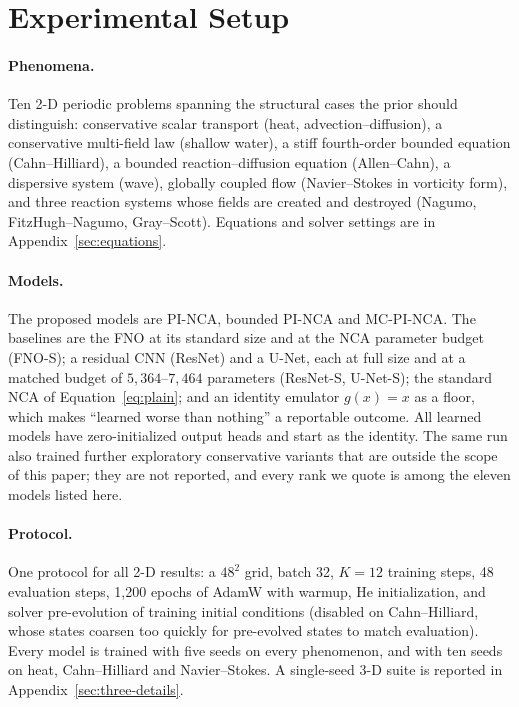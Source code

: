 \documentclass{article}
\begin{document}
\section{Experimental Setup}
\label{sec:problem}
\label{sec:protocol}
\paragraph{Phenomena.} Ten 2-D periodic problems spanning the structural cases the prior
should distinguish: conservative scalar transport (heat, advection--diffusion), a
conservative multi-field law (shallow water), a stiff fourth-order bounded equation
(Cahn--Hilliard), a bounded reaction--diffusion equation (Allen--Cahn), a dispersive
system (wave), globally coupled flow (Navier--Stokes in vorticity form), and three
reaction systems whose fields are created and destroyed (Nagumo, FitzHugh--Nagumo,
Gray--Scott). Equations and solver settings are in Appendix~\ref{sec:equations}.

\paragraph{Models.} The proposed models are PI-NCA, bounded PI-NCA and MC-PI-NCA. The
baselines are the FNO \citep{li2020fno} at its standard size and at the NCA parameter
budget (FNO-S); a residual CNN (ResNet) and a U-Net, each at full size and at a matched
budget of $5{,}364$--$7{,}464$ parameters (ResNet-S, U-Net-S); the standard NCA of
Equation~\ref{eq:plain}; and an identity emulator $g(x)=x$ as a floor, which makes
``learned worse than nothing'' a reportable outcome. All learned models have
zero-initialized output heads and start as the identity. The same run also trained
further exploratory conservative variants that are outside the scope of this paper; they
are not reported, and every rank we quote is among the eleven models listed here.

\paragraph{Protocol.} One protocol for all 2-D results: a $48^2$ grid, batch 32, $K=12$
training steps, 48 evaluation steps, 1{,}200 epochs of AdamW with warmup, He
initialization, and solver pre-evolution of training initial conditions (disabled on
Cahn--Hilliard, whose states coarsen too quickly for pre-evolved states to match
evaluation). Every model is trained with five seeds on every phenomenon, and with ten
seeds on heat, Cahn--Hilliard and Navier--Stokes. A single-seed 3-D suite is reported in
Appendix~\ref{sec:three-details}.
\end{document}
